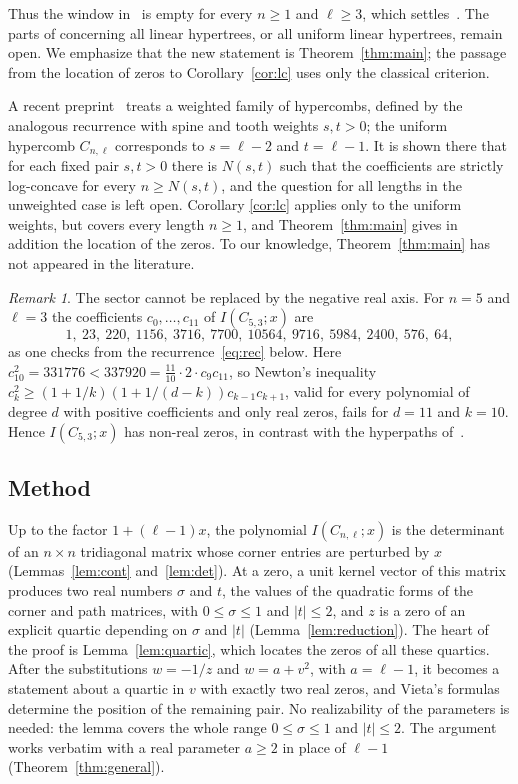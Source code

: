 \documentclass{amsart}
\theoremstyle{remark}
\newtheorem{remark}[theorem]{Remark}
\numberwithin{equation}{section}
\begin{document}
Thus the window in~\cite[Corollary~1.8]{GS} is empty for every $n\ge 1$ and
$\ell\ge 3$, which settles~\cite[Question~1.10(4)]{GS}. The parts of
\cite[Question~1.10]{GS} concerning all linear hypertrees, or all uniform
linear hypertrees, remain open. We emphasize that the new statement is
Theorem~\ref{thm:main}; the passage from the location of zeros to
Corollary~\ref{cor:lc} uses only the classical criterion.

A recent preprint~\cite{Ast} treats a weighted family of hypercombs, defined
by the analogous recurrence with spine and tooth weights $s,t>0$; the uniform
hypercomb $C_{n,\ell}$ corresponds to $s=\ell-2$ and $t=\ell-1$. It is shown
there that for each fixed pair $s,t>0$ there is $N(s,t)$ such that the
coefficients are strictly log-concave for every $n\ge N(s,t)$, and the
question for all lengths in the unweighted case is left open. Corollary
\ref{cor:lc} applies only to the uniform weights, but covers every length
$n\ge 1$, and Theorem~\ref{thm:main} gives in addition the location of the
zeros. To our knowledge, Theorem~\ref{thm:main} has not appeared in the
literature.

\begin{remark}\label{rem:notreal}
The sector cannot be replaced by the negative real axis. For $n=5$ and
$\ell=3$ the coefficients $c_0,\dots,c_{11}$ of $I(C_{5,3};x)$ are
\[
1,\ 23,\ 220,\ 1156,\ 3716,\ 7700,\ 10564,\ 9716,\ 5984,\ 2400,\ 576,\ 64,
\]
as one checks from the recurrence~\eqref{eq:rec} below. Here
$c_{10}^2=331776<337920=\tfrac{11}{10}\cdot 2\cdot c_9c_{11}$, so Newton's
inequality $c_k^2\ge(1+1/k)(1+1/(d-k))c_{k-1}c_{k+1}$, valid for every
polynomial of degree $d$ with positive coefficients and only real zeros,
fails for $d=11$ and $k=10$. Hence $I(C_{5,3};x)$ has non-real zeros, in contrast with the
hyperpaths of~\cite[Theorem~1.3]{GS}.
\end{remark}

\subsection*{Method}
Up to the factor $1+(\ell-1)x$, the polynomial $I(C_{n,\ell};x)$ is the
determinant of an $n\times n$ tridiagonal matrix whose corner entries are
perturbed by $x$ (Lemmas~\ref{lem:cont} and~\ref{lem:det}). At a zero, a
unit kernel vector of this matrix produces two real numbers $\sigma$ and
$t$, the values of the quadratic forms of the corner and path matrices, with
$0\le\sigma\le 1$ and $|t|\le 2$, and $z$ is a zero of an explicit quartic
depending on $\sigma$ and $|t|$ (Lemma~\ref{lem:reduction}). The heart of
the proof is Lemma~\ref{lem:quartic}, which locates the zeros of all these
quartics. After the substitutions $w=-1/z$ and $w=a+v^2$, with $a=\ell-1$,
it becomes a statement about a quartic in $v$ with exactly two real zeros,
and Vieta's formulas determine the position of the remaining pair. No
realizability of the parameters is needed: the lemma covers the whole range
$0\le\sigma\le 1$ and $|t|\le 2$. The argument works verbatim with a real
parameter $a\ge 2$ in place of $\ell-1$ (Theorem~\ref{thm:general}).
\end{document}
